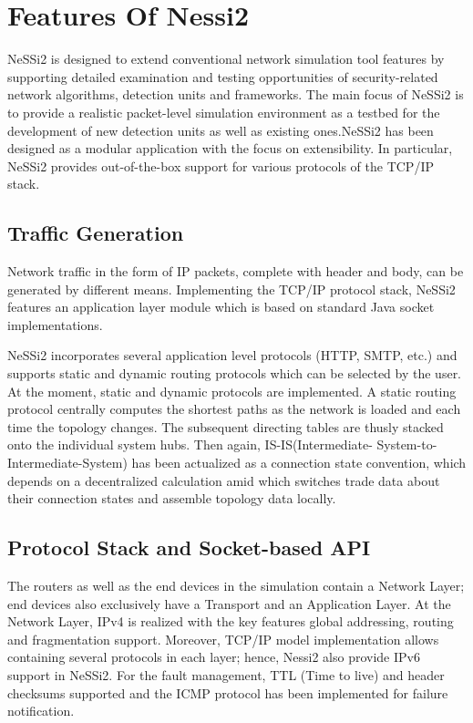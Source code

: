 \section{Features Of Nessi2}
NeSSi2 is designed to extend conventional network simulation tool features by supporting
detailed examination and testing opportunities of security-related network algorithms,
detection units and frameworks. The main focus of NeSSi2 is to provide a
realistic packet-level simulation environment as a testbed for the development of new
detection units as well as existing ones.NeSSi2 has been designed as a modular application with the focus on extensibility. In particular, NeSSi2 provides out-of-the-box support for various protocols of the TCP/IP stack.
\subsection{Traffic Generation}
Network traffic in the form of IP packets, complete with header and body, can be generated by different means. Implementing the TCP/IP protocol stack, NeSSi2 features an application layer module which is based on standard Java socket implementations.

NeSSi2 incorporates several application level protocols (HTTP, SMTP, etc.) and supports
static and dynamic routing protocols which can be selected by the user. At the
moment, static and dynamic protocols are implemented. A static routing protocol centrally computes the shortest paths as the network is loaded and each time the topology changes. The subsequent directing tables are thusly stacked onto the
individual system hubs. Then again, IS-IS(Intermediate- System-to- Intermediate-System) has been
actualized as a connection state convention, which depends on a decentralized calculation amid which
switches trade data about their connection states and assemble topology data locally.
\subsection{Protocol Stack and Socket-based API}
The routers as well as the end devices in the simulation contain a Network Layer; end devices also exclusively have a Transport and an Application Layer. At the Network Layer, IPv4 is realized with the key features global addressing, routing and fragmentation support. Moreover, TCP/IP model implementation allows containing several protocols in each layer; hence, Nessi2 also provide IPv6 support in NeSSi2. For the fault management, TTL (Time to live) and header checksums supported and the ICMP protocol has been implemented for failure notification.


